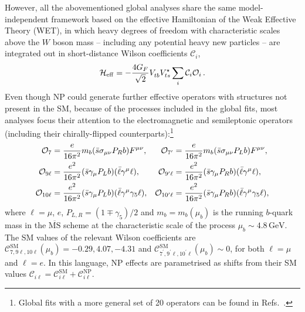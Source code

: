 \documentclass[10pt]{article}
\begin{document}
However, all the abovementioned global analyses share the same model-independent framework based on the effective Hamiltonian of the Weak Effective Theory (WET), in which heavy degrees of freedom with characteristic scales above the $W$ boson mass -- including any potential heavy new particles -- are integrated out in short-distance Wilson coefficients $\mathcal{C}_i$,
%
\begin{eqnarray}
{\cal H}_{\rm eff} = -\frac{4G_F}{\sqrt{2}}V_{tb}^{} V^\star_{ts}\sum_i\mathcal{C}_i{\cal O}_i\,.
\label{effH}
\end{eqnarray}
%
Even though NP could generate further effective operators with structures not present in the SM, because of the processes included in the global fits, most analyses focus their attention to the electromagnetic and semileptonic operators (including their chirally-flipped counterparts):\footnote{Global fits with a more general set of 20 operators can be found in Refs.~\cite{Arbey:2018ics,Arbey:2019duh,Hurth:2021nsi}.}
%
\begin{align}
{\cal O}_7 &= \frac{e}{16\pi^2}m_b(\bar{s}\sigma_{\mu\nu}P_Rb)F^{\mu\nu}, &{\cal O}_{7^\prime} &= \frac{e}{16\pi^2}m_b(\bar{s}\sigma_{\mu\nu}P_Lb)F^{\mu\nu}, \nonumber \\
{\cal O}_{9\ell} &= \frac{e^2}{16\pi^2}(\bar{s}\gamma_{\mu}P_Lb)(\bar\ell \gamma^\mu\ell), &{\cal O}_{9^\prime\ell} &= \frac{e^2}{16\pi^2}(\bar{s}\gamma_{\mu}P_Rb)(\bar\ell \gamma^\mu\ell), \nonumber \\
{\cal O}_{10\ell} &= \frac{e^2}{16\pi^2}(\bar{s}\gamma_{\mu}P_Lb)(\bar\ell \gamma^\mu\gamma_5\ell), &{\cal O}_{10^\prime\ell} &= \frac{e^2}{16\pi^2}(\bar{s}\gamma_{\mu}P_Rb)(\bar\ell \gamma^\mu\gamma_5\ell),
\end{align}
%
where $\ell=\mu$, $e$, $P_{L,R}=(1\mp \gamma_5)/2$ and $m_b=m_b(\mu_b)$ is the running $b$-quark mass in the $\overline{\text{MS}}$ scheme at the characteristic scale of the process $\mu_b\sim 4.8\,\text{GeV}$. The SM values of the relevant Wilson coefficients are $\mathcal{C}^\text{SM}_{7,9\ell,10\ell}(\mu_b)=-0.29,4.07,-4.31$ and $\mathcal{C}^\text{SM}_{7^\prime,9^\prime\ell,10^\prime\ell}(\mu_b)\sim 0$, for both $\ell=\mu$ and $\ell=e$. In this language, NP effects are parametrised as shifts from their SM values $\mathcal{C}_{i\ell} = \mathcal{C}_{i\ell}^\text{SM}+\mathcal{C}_{i\ell}^\text{NP}$.
\end{document}
